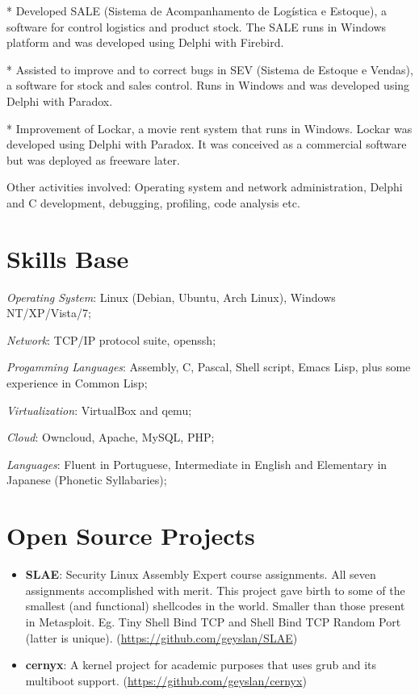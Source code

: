 \documentclass[margin]{res}
\begin{document}
\begin{resume}
* Developed SALE (Sistema de Acompanhamento de Logística e Estoque), a
software for control logistics and product stock. The SALE runs in
Windows platform and was developed using Delphi with Firebird.

* Assisted to improve and to correct bugs in SEV (Sistema de Estoque e
Vendas), a software for stock and sales control. Runs in Windows and
was developed using Delphi with Paradox.

* Improvement of Lockar, a movie rent system that runs in Windows. Lockar was
developed using Delphi with Paradox. It was conceived as a commercial software
but was deployed as freeware later.

Other activities involved: Operating system and network administration, Delphi
and C development, debugging, profiling, code analysis etc.

\section{Skills Base} \textit{Operating System}: Linux (Debian, Ubuntu, Arch
Linux), Windows NT/XP/Vista/7;

\textit{Network}: TCP/IP protocol suite, openssh;

\textit{Progamming Languages}: Assembly, C, Pascal, Shell script, Emacs Lisp,
plus some experience in Common Lisp;

\textit{Virtualization}: VirtualBox and qemu;

\textit{Cloud}: Owncloud, Apache, MySQL, PHP;

\textit{Languages}: Fluent in Portuguese, Intermediate in English and
Elementary in Japanese (Phonetic Syllabaries);

\section{Open Source Projects}
\begin{itemize}
\item \textbf{SLAE}: Security Linux Assembly Expert course assignments. All
  seven assignments accomplished with merit. This project gave birth to some of
  the smallest (and functional) shellcodes in the world. Smaller than those
  present in Metasploit. Eg. Tiny Shell Bind TCP and Shell Bind TCP Random Port
  (latter is unique).\newline
  (\url{https://github.com/geyslan/SLAE})\vspace{1mm}

\item \textbf{cernyx}: A kernel project for academic purposes that uses grub and
  its multiboot support.\newline
  (\url{https://github.com/geyslan/cernyx})\vspace{1mm}


\end{itemize}
\end{resume}
\end{document}
